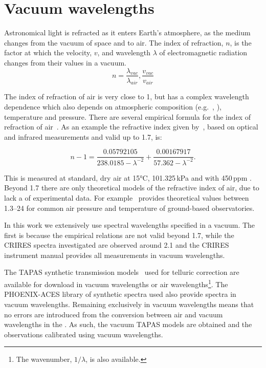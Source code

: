 
\chapter{Vacuum wavelengths}
Astronomical light is refracted as it enters Earth's atmosphere, as the medium changes from the vacuum of space and to air.
The index of refraction, \(n\), is the factor at which the velocity, \(v\), and wavelength \(\lambda\) of electromagnetic radiation changes from their values in a vacuum.
\begin{equation}
n  = \frac{\lambda_{vac}}{\lambda_{air}}, \frac{v_{vac}}{v_{air}}
\end{equation}

The index of refraction of air is very close to 1, but has a complex wavelength dependence which also depends on atmospheric composition (e.g.\ , ), temperature and pressure.
There are several empirical formula for the index of refraction of air~\citep[e.g.][]{edlen_dispersion_1953, peck_dispersion_1972, ciddor_refractive_1996}.
As an example the refractive index given by~\citet{ciddor_refractive_1996}, based on optical and infrared measurements and valid up to 1.7\um{}, is:

\begin{equation}
    n -1 = \frac{0.05792105}{238.0185 - \lambda^{-2}} + \frac{0.00167917}{57.362 - \lambda^{-2}}.
\end{equation}

This is measured at standard, dry air at 15\si{\degreeCelsius}, 101.325\,\si{\kilo\pascal} and with 450\,ppm .
Beyond 1.7\um{} there are only theoretical models of the refractive index of air, due to lack a of experimental data.
For example~\citet{mathar_refractive_2007} provides theoretical values between 1.3--24\um{} for common air pressure and temperature of ground-based observatories.

In this work we extensively use spectral wavelengths specified in a vacuum.
The first is because the empirical relations are not valid beyond 1.7\um{}, while the {CRIRES} spectra investigated are observed around 2.1\um{} and the {CRIRES} instrument manual provides all measurements in vacuum wavelengths.

The {TAPAS} synthetic transmission models~\citet{bertaux_tapas_2014} used for telluric correction are available for download in vacuum wavelengths or air wavelengths\footnote{The wavenumber, \(1/\lambda\), is also available.}.
The {PHOENIX-ACES} library of synthetic spectra used also provide spectra in vacuum wavelengths.
Remaining exclusively in vacuum wavelengths means that no errors are introduced from the conversion between air and vacuum wavelengths in the \nir{}.
As such, the vacuum {TAPAS} models are obtained and the observations calibrated using vacuum wavelengths.
